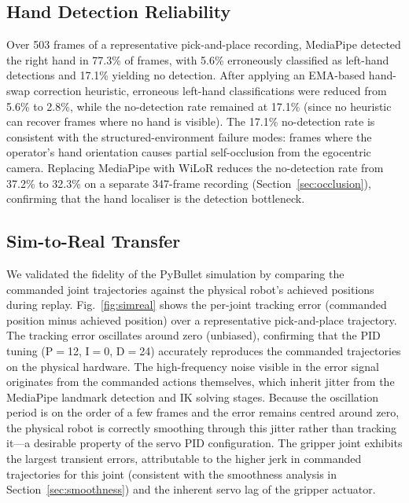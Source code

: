 \documentclass{ieeeaccess}
\begin{document}
\subsection{Hand Detection Reliability}
\label{sec:handstats}

Over 503 frames of a representative pick-and-place recording,
MediaPipe detected the right hand in 77.3\% of frames, with 5.6\%
erroneously classified as left-hand detections and 17.1\% yielding
no detection. After applying an EMA-based hand-swap correction
heuristic, erroneous left-hand classifications were reduced from
5.6\% to 2.8\%, while the no-detection rate remained at 17.1\%
(since no heuristic can recover frames where no hand is visible).
The 17.1\% no-detection rate is consistent with the structured-environment
failure modes: frames where the operator's hand orientation causes
partial self-occlusion from the egocentric camera. Replacing MediaPipe
with WiLoR reduces the no-detection rate from 37.2\% to 32.3\% on
a separate 347-frame recording (Section~\ref{sec:occlusion}),
confirming that the hand localiser is the detection bottleneck.

\subsection{Sim-to-Real Transfer}
\label{sec:simreal}

We validated the fidelity of the PyBullet simulation by comparing
the commanded joint trajectories against the physical robot's
achieved positions during replay. Fig.~\ref{fig:simreal} shows the
per-joint tracking error (commanded position minus achieved position)
over a representative pick-and-place trajectory.
The tracking error oscillates around zero (unbiased), confirming
that the PID tuning (P$=$12, I$=$0, D$=$24) accurately reproduces
the commanded trajectories on the physical hardware.
The high-frequency noise visible in the error signal originates from
the commanded actions themselves, which inherit jitter from the
MediaPipe landmark detection and IK solving stages. Because the
oscillation period is on the order of a few frames and the error
remains centred around zero, the physical robot is correctly smoothing
through this jitter rather than tracking it---a desirable property of
the servo PID configuration. The gripper joint exhibits the largest transient errors, attributable
to the higher jerk in commanded trajectories for this joint
(consistent with the smoothness analysis in
Section~\ref{sec:smoothness}) and the inherent servo lag of the
gripper actuator.
\end{document}
